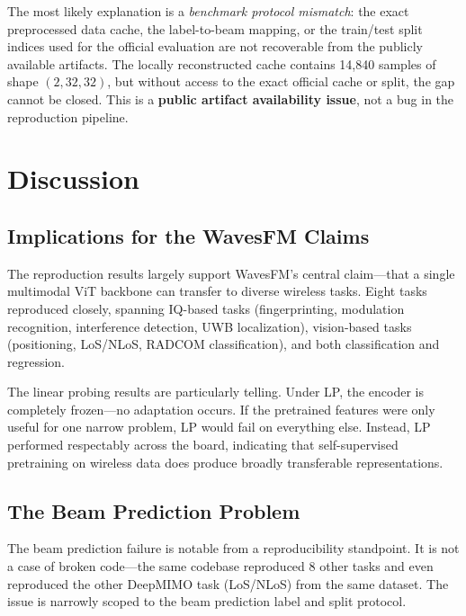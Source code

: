\documentclass[11pt]{article}
\begin{document}
The most likely explanation is a \textit{benchmark protocol mismatch}: the exact preprocessed data cache, the label-to-beam mapping, or the train/test split indices used for the official evaluation are not recoverable from the publicly available artifacts. The locally reconstructed cache contains 14,840 samples of shape $(2, 32, 32)$, but without access to the exact official cache or split, the gap cannot be closed. This is a \textbf{public artifact availability issue}, not a bug in the reproduction pipeline.


\section{Discussion}
\label{sec:discussion}

\subsection{Implications for the WavesFM Claims}

The reproduction results largely support WavesFM's central claim---that a single multimodal ViT backbone can transfer to diverse wireless tasks. Eight tasks reproduced closely, spanning IQ-based tasks (fingerprinting, modulation recognition, interference detection, UWB localization), vision-based tasks (positioning, LoS/NLoS, RADCOM classification), and both classification and regression.

The linear probing results are particularly telling. Under LP, the encoder is completely frozen---no adaptation occurs. If the pretrained features were only useful for one narrow problem, LP would fail on everything else. Instead, LP performed respectably across the board, indicating that self-supervised pretraining on wireless data does produce broadly transferable representations.

\subsection{The Beam Prediction Problem}

The beam prediction failure is notable from a reproducibility standpoint. It is not a case of broken code---the same codebase reproduced 8 other tasks and even reproduced the other DeepMIMO task (LoS/NLoS) from the same dataset. The issue is narrowly scoped to the beam prediction label and split protocol.
\end{document}
